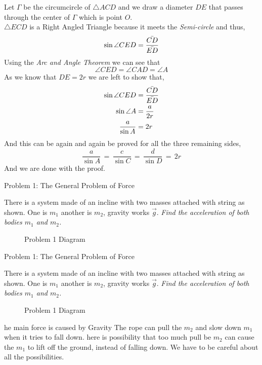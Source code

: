 \documentclass[9pt,serif]{beamer}
\newcommand{\prob}[1]{ \begin{problem.} #1 \end{problem.}}
\newcommand{\draw}[3]{ \begin{figure}[hbt!] \centering
 \fontsize{35pt}{20pt}\selectfont \resizebox{#1 \textwidth}{!}{
{#2.pdf_tex}}\caption{#3} \label{#3} \end{figure} }
\begin{document}
\begin{frame}
 Let $\Gamma$ be the circumcircle of $\triangle ACD$ and we draw a diameter $DE$ that passes through the center of $\Gamma$ which is point $O$. \\
 $\triangle ECD$ is a Right Angled Triangle because it meets the \emph{Semi-circle} and thus,
 \[ \sin \angle CED = \frac{\Bar{CD}}{\Bar{ED}}\]
 Using the \emph{Arc and Angle Theorem} we can see that  
 \[ \angle CED = \angle CAD = \angle A \]
 As we know that $DE = 2r$ we are left to show that,
 \begin{align}
 \sin \angle CED &=  \frac{\Bar{CD}}{\Bar{ED}} \notag \\
 \sin \angle A & = \frac{a}{2r} \\
 \frac{a}{\sin A} & = 2r
 \end{align}
 And this can be again and again be proved for all the three remaining sides,
 \begin{equation}
 \frac{a}{\sin A} \,=\, \frac{c}{\sin C} \,=\, \frac{d}{\sin D} \, = \, 2r
 \end{equation}
 And we are done with the proof.
\end{frame}



\begin{frame}{Problem 1: The General Problem of Force}

    \prob{There is a system made of an incline with two masses attached with
    string as shown. One is $m_1 $ another is $ m_2$, gravity works $\vec{g}$.
\emph{Find the acceleration of both bodies  $m_1$ and $m_2$. }}  
    
    \draw{0.6}{prob1-1}{Problem 1 Diagram} 

\end{frame}




\begin{frame}{Problem 1: The General Problem of Force}

    \prob{There is a system made of an incline with two masses attached with
    string as shown. One is $m_1 $ another is $ m_2$, gravity works $\vec{g}$.
\emph{Find the acceleration of both bodies  $m_1$ and $m_2$. }}
\begin{minipage}{0.4\textwidth}
       
    \draw{0.8}{prob1-1}{Problem 1 Diagram} 

   \end{minipage} \hfill 
   \begin{minipage}{0.5 \textwidth}
   \begin{small}
       he main force is caused by Gravity \pause
The rope can pull the $m_2$ and slow down $m_1 $ when it tries to fall down. \pause
  here is possibility that too much pull be $m_2$ can cause the $m_1 $ to lift off the ground, instead of falling down. 
  We have to be careful about all the possibilities.
     \end{small} 
   \end{minipage} 
   \end{frame}
\end{document}
